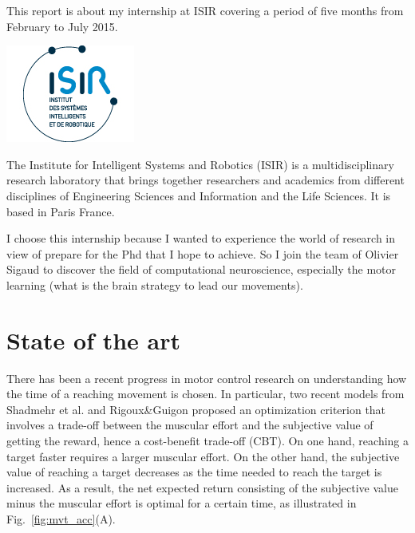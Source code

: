 \documentclass[pdftex,a4paper,11pt]{report}
\begin{document}
This report is about my internship at ISIR covering a period of five months from February to July 2015.
\linebreak 
\linebreak
\linebreak
\begin{minipage}{0.49\textwidth}
	\includegraphics[]{images/logo_isir.jpg}
\end{minipage}
\begin{minipage}{0.49\textwidth}
	The Institute for Intelligent Systems and Robotics (ISIR) is a multidisciplinary research laboratory that brings together researchers and academics from different disciplines of Engineering Sciences and Information and the Life Sciences. It is based in Paris France.
\end{minipage}
\vspace{8mm}

I choose this internship because I wanted to experience the world of research in view of prepare for the Phd that I hope to achieve. So I join the team of Olivier Sigaud to discover the field of computational neuroscience, especially the motor learning (what is the brain strategy to lead our movements).

\pagebreak

\section{State of the art}

There has been a recent progress in motor control research on understanding how the time of a reaching movement is chosen. In particular, two recent models from Shadmehr et al. \cite{shadmehr10} and Rigoux\&Guigon \cite{rigoux12_plos} proposed an optimization criterion that involves a trade-off between the muscular effort and the subjective value of getting the reward, hence a cost-benefit trade-off (CBT).
On one hand, reaching a target faster requires a larger muscular effort. On the other hand, the subjective value of reaching a target decreases as the time needed to reach the target is increased. As a result, the net expected return consisting of the subjective value minus the muscular effort is optimal for a certain time, as illustrated in Fig.~\ref{fig:mvt_acc}(A).
\end{document}
